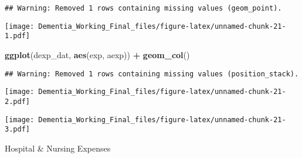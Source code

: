 \documentclass[]{article}
\newenvironment{Shaded}{\begin{snugshade}}{\end{snugshade}}
\newcommand{\CommentTok}[1]{\textcolor[rgb]{0.56,0.35,0.01}{\textit{#1}}}
\newcommand{\DecValTok}[1]{\textcolor[rgb]{0.00,0.00,0.81}{#1}}
\newcommand{\KeywordTok}[1]{\textcolor[rgb]{0.13,0.29,0.53}{\textbf{#1}}}
\newcommand{\NormalTok}[1]{#1}
\newcommand{\OperatorTok}[1]{\textcolor[rgb]{0.81,0.36,0.00}{\textbf{#1}}}
\newcommand{\StringTok}[1]{\textcolor[rgb]{0.31,0.60,0.02}{#1}}
\begin{document}
\begin{verbatim}
## Warning: Removed 1 rows containing missing values (geom_point).
\end{verbatim}

\texttt{[image: Dementia\_Working\_Final\_files/figure-latex/unnamed-chunk-21-1.pdf]}

\begin{Shaded}
\begin{Highlighting}[]
\KeywordTok{ggplot}\NormalTok{(dexp_dat, }\KeywordTok{aes}\NormalTok{(exp, aexp)) }\OperatorTok{+}\StringTok{ }\KeywordTok{geom_col}\NormalTok{()}
\end{Highlighting}
\end{Shaded}

\begin{verbatim}
## Warning: Removed 1 rows containing missing values (position_stack).
\end{verbatim}

\texttt{[image: Dementia\_Working\_Final\_files/figure-latex/unnamed-chunk-21-2.pdf]}

\begin{Shaded}
\end{Shaded}

\texttt{[image: Dementia\_Working\_Final\_files/figure-latex/unnamed-chunk-21-3.pdf]}

Hospital \& Nursing Expenses
\end{document}

